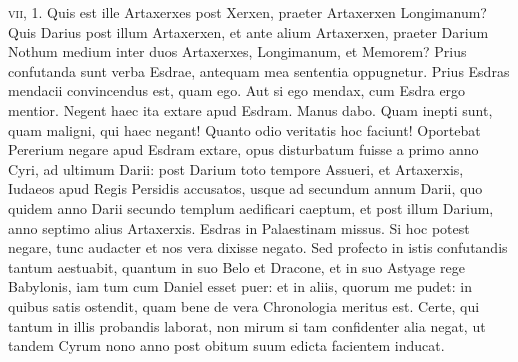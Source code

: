 \begin{parnumbers}
\textsc{vii}, 1.
\lnr{}Quis
est ille Artaxerxes post Xerxen, praeter Artaxerxen Longimanum?
\lnr{}Quis Darius post illum Artaxerxen, et ante alium Artaxerxen, praeter
Darium Nothum medium inter duos Artaxerxes, Longimanum,
et Memorem?
\lnr{}Prius confutanda sunt verba Esdrae, antequam
mea sententia oppugnetur.
\lnr{}Prius Esdras mendacii convincendus
est, quam ego.
\lnr{}Aut si ego mendax, cum Esdra ergo mentior.
\lnr{}Negent haec ita extare apud Esdram.
\lnr{}Manus dabo.
\lnr{}Quam inepti
sunt, quam maligni, qui haec negant!
\lnr{}Quanto odio veritatis hoc faciunt!
\lnr{}Oportebat Pererium negare apud Esdram extare, opus disturbatum
fuisse a primo anno Cyri, ad ultimum Darii: post Darium
toto tempore Assueri, et Artaxerxis, Iudaeos apud Regis Persidis
accusatos, usque ad secundum annum Darii, quo quidem anno
Darii secundo templum aedificari caeptum, et post illum Darium,
anno septimo alius Artaxerxis.
\lnr{}Esdras in Palaestinam missus.
\lnr{}Si hoc potest negare, tunc audacter et nos vera dixisse negato.
\lnr{}Sed profecto
in istis confutandis tantum aestuabit, quantum in suo Belo et
Dracone, et in suo Astyage rege Babylonis, iam tum cum Daniel
esset puer: et in aliis, quorum me pudet: in quibus satis ostendit,
quam bene de vera Chronologia meritus est.
\lnr{}Certe, qui tantum in
illis probandis laborat, non mirum si tam confidenter alia negat, ut
tandem Cyrum nono anno post obitum suum edicta facientem inducat.


\end{parnumbers}
